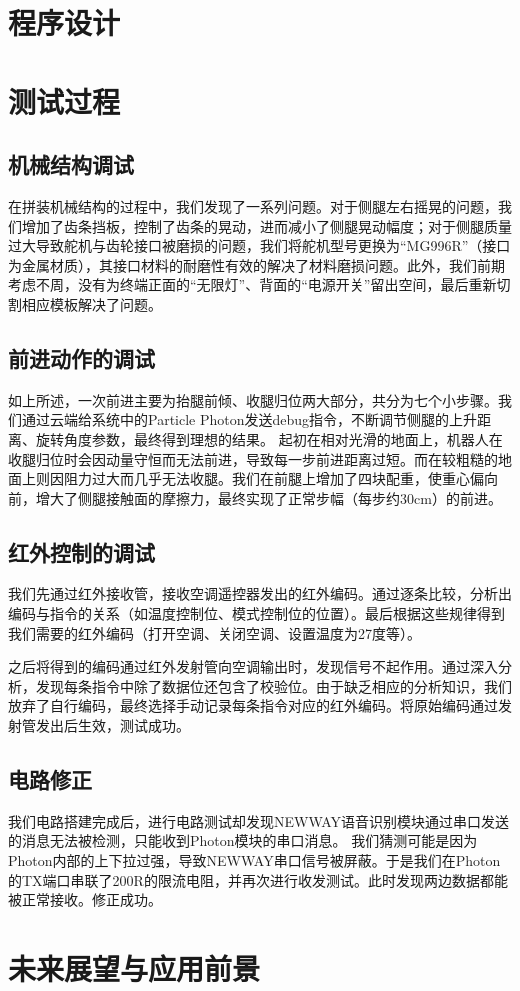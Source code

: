 \section{程序设计}

\section{测试过程}
    \subsection{机械结构调试}
    \hspace{1.5em}在拼装机械结构的过程中，我们发现了一系列问题。对于侧腿左右摇晃的问题，我们增加了齿条挡板，控制了齿条的晃动，进而减小了侧腿晃动幅度；对于侧腿质量过大导致舵机与齿轮接口被磨损的问题，我们将舵机型号更换为“MG996R”（接口为金属材质），其接口材料的耐磨性有效的解决了材料磨损问题。此外，我们前期考虑不周，没有为终端正面的“无限灯”、背面的“电源开关”留出空间，最后重新切割相应模板解决了问题。

    \subsection{前进动作的调试}
    \hspace{1.5em}如上所述，一次前进主要为抬腿前倾、收腿归位两大部分，共分为七个小步骤。我们通过云端给系统中的Particle Photon发送debug指令，不断调节侧腿的上升距离、旋转角度参数，最终得到理想的结果。
    \hspace{1.5em}起初在相对光滑的地面上，机器人在收腿归位时会因动量守恒而无法前进，导致每一步前进距离过短。而在较粗糙的地面上则因阻力过大而几乎无法收腿。我们在前腿上增加了四块配重，使重心偏向前，增大了侧腿接触面的摩擦力，最终实现了正常步幅（每步约30cm）的前进。

    \subsection{红外控制的调试}
    \hspace{1.5em}我们先通过红外接收管，接收空调遥控器发出的红外编码。通过逐条比较，分析出编码与指令的关系（如温度控制位、模式控制位的位置）。最后根据这些规律得到我们需要的红外编码（打开空调、关闭空调、设置温度为27度等）。

    \hspace{1.5em}之后将得到的编码通过红外发射管向空调输出时，发现信号不起作用。通过深入分析，发现每条指令中除了数据位还包含了校验位。由于缺乏相应的分析知识，我们放弃了自行编码，最终选择手动记录每条指令对应的红外编码。将原始编码通过发射管发出后生效，测试成功。

    \subsection{电路修正}
    \hspace{1.5em}我们电路搭建完成后，进行电路测试却发现NEWWAY语音识别模块通过串口发送的消息无法被检测，只能收到Photon模块的串口消息。
    \hspace{1.5em}我们猜测可能是因为Photon内部的上下拉过强，导致NEWWAY串口信号被屏蔽。于是我们在Photon的TX端口串联了200R的限流电阻，并再次进行收发测试。此时发现两边数据都能被正常接收。修正成功。

\section{未来展望与应用前景}




